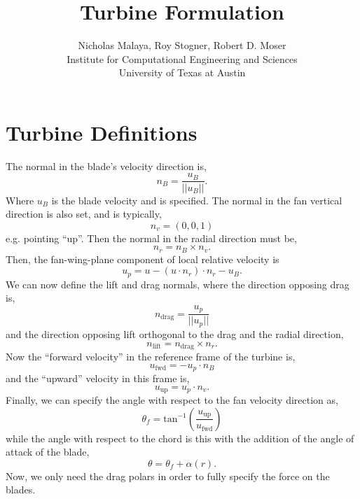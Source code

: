 \documentclass{article}
\title{\bf{Turbine Formulation}}
\author{Nicholas Malaya, Roy Stogner, Robert D. Moser \\ Institute for
Computational Engineering and Sciences \\ University of Texas at Austin}
\date{}
\begin{document}
\maketitle
\newpage
\section{Turbine Definitions}

The normal in the blade's velocity direction is, 
\begin{equation}
n_B = \frac{u_B}{||u_B||}. 
\end{equation}
Where $u_B$ is the blade velocity and is specified.
The normal in the fan vertical direction is also set, and is typically, 
\begin{equation}
n_v = \left(0,0,1\right)
\end{equation}
e.g. pointing ``up''. Then the normal in the radial direction must be, 
\begin{equation}
n_r = n_B \times n_v. 
\end{equation}
Then, the fan-wing-plane component of local relative velocity is
\begin{equation}
u_p = u - (u\cdot n_r)\cdot n_r - u_B. 
\end{equation}
We can now define the lift and drag normals, where the direction
opposing drag is, 
\begin{equation}
n_{\text{drag}} = \frac{u_p}{||u_p||} 
\end{equation}
and the direction opposing lift orthogonal to the drag and the radial direction, 
\begin{equation}
n_{\text{lift}}= n_{\text{drag}} \times n_r. 
\end{equation}
Now the ``forward velocity'' in the reference frame of the turbine is, 
\begin{equation}
u_{\text{fwd}}= -u_p \cdot n_B
\end{equation}
and the ``upward'' velocity in this frame is, 
\begin{equation}
u_{\text{up}} = u_p \cdot n_v. 
\end{equation}
Finally, we can specify the angle with respect to the fan velocity
direction as, 
\begin{equation}
 \theta_f = \text{tan}^{-1}\left(\frac{u_{\text{up}}}{u_{\text{fwd}}}\right)
\end{equation}
while the angle with respect to the chord is this with the addition of
the angle of attack of the blade, 
\begin{equation}
 \theta = \theta_f + \alpha(r).
\end{equation}
Now, we only need the drag polars in order to fully specify the force
on the blades.
\end{document}
